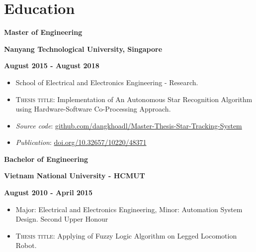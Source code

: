 \section{Education}
\vspace{-2mm}
\begin{multicols}{3}
    \begin{flushleft}
        \textbf{Master of Engineering}
    \end{flushleft}

    \columnbreak

    \begin{center}
        \textbf{Nanyang Technological University, Singapore}
    \end{center}

    \columnbreak

    \begin{flushright}
        \textbf{August 2015 - August 2018}
    \end{flushright}
\end{multicols}

\vspace{-5mm}

\begin{itemize}[noitemsep,leftmargin=*] %
    \item School of Electrical and Electronics Engineering - Research.
    \item \textsc{Thesis title}: Implementation of An Autonomous Star Recognition Algorithm using Hardware-Software Co-Processing Approach.
    \item \emph{Source code}: \href{https://github.com/dangkhoadl/Master-Thesis-Star-Tracking-System}{github.com/dangkhoadl/Master-Thesis-Star-Tracking-System}
    \item \emph{Publication}: \href{https://doi.org/10.32657/10220/48371}{doi.org/10.32657/10220/48371}
\end{itemize}
\vspace{-2mm}

\begin{multicols}{3}
    \begin{flushleft}
        \textbf{Bachelor of Engineering}
    \end{flushleft}

    \columnbreak

    \begin{center}
        \textbf{Vietnam National University - HCMUT}
    \end{center}

    \columnbreak

    \begin{flushright}
        \textbf{August 2010 - April 2015}
    \end{flushright}
\end{multicols}

\vspace{-5mm}

\begin{itemize}[noitemsep,leftmargin=*]
    \item Major: Electrical and Electronics Engineering, Minor: Automation System Design. Second Upper Honour
    \item \textsc{Thesis title}: Applying of Fuzzy Logic Algorithm on Legged Locomotion Robot.
\end{itemize}
